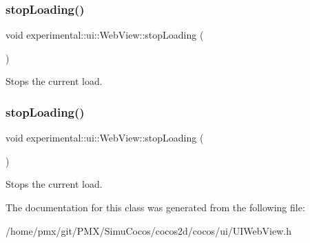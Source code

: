 \subsubsection{\texorpdfstring{stop\+Loading()}{stopLoading()}\hspace{0.1cm}{\footnotesize\ttfamily [1/2]}}
{\footnotesize\ttfamily void experimental\+::ui\+::\+Web\+View\+::stop\+Loading (\begin{DoxyParamCaption}{ }\end{DoxyParamCaption})}

Stops the current load. \mbox{\label{classexperimental_1_1ui_1_1WebView_a75b2a3f82d7c6ed497577e6ae481b81a}} 
\subsubsection{\texorpdfstring{stop\+Loading()}{stopLoading()}\hspace{0.1cm}{\footnotesize\ttfamily [2/2]}}
{\footnotesize\ttfamily void experimental\+::ui\+::\+Web\+View\+::stop\+Loading (\begin{DoxyParamCaption}{ }\end{DoxyParamCaption})}

Stops the current load. 

The documentation for this class was generated from the following file\+:\begin{DoxyCompactItemize}
\item 
/home/pmx/git/\+P\+M\+X/\+Simu\+Cocos/cocos2d/cocos/ui/U\+I\+Web\+View.\+h\end{DoxyCompactItemize}

